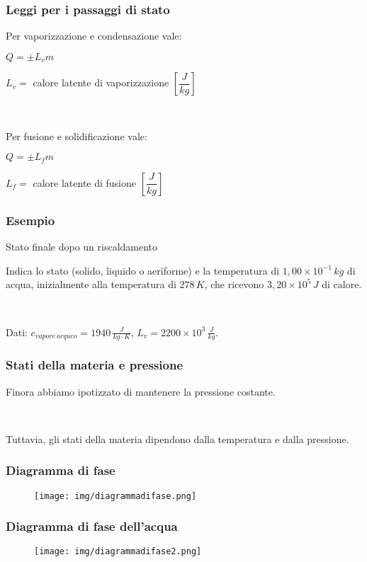 \documentclass[]{beamer}
\theoremstyle{plain}
\begin{document}
\begin{frame}
\frametitle{Leggi per i passaggi di stato}
Per \alert<1>{vaporizzazione e condensazione} vale:
\begin{center}
\colorbox{blue!30}{$ Q = \pm L_v m $}


$ L_v = $ calore latente di vaporizzazione $ \left[ \dfrac{J}{kg} \right] $
\end{center}\pause

~

Per \alert<2>{fusione e solidificazione} vale:
\begin{center}
\colorbox{blue!30}{$ Q = \pm L_f m $}


$ L_f = $ calore latente di fusione $ \left[ \dfrac{J}{kg} \right] $
\end{center}
\end{frame}


\begin{frame}
\frametitle{Esempio}
\begin{exampleblock}{Stato finale dopo un riscaldamento}
{\small Indica lo stato (solido, liquido o aeriforme) e la temperatura di $ 1,00 \times 10^{-1} \, kg  $ di acqua, inizialmente alla temperatura di $ 278 \, K $, che ricevono $ 3,20 \times 10^5 \, J  $ di calore.

~

Dati: $ c_{vapore \, acqueo} = 1940 \, \frac{J}{kg\cdot K} $, $ L_v = 2200 \times 10^3 \, \frac{J}{kg} $.}
\end{exampleblock}
\end{frame}



\begin{frame}
\frametitle{Stati della materia e pressione}
Finora abbiamo ipotizzato di \alert<1>{mantenere la pressione costante}.\pause

~

Tuttavia, gli stati della materia \alert<2>{dipendono dalla temperatura e dalla pressione}.

\begin{center}
\href{video/Acqua.mp4}{}
\end{center}
\end{frame}


\begin{frame}
\frametitle{Diagramma di fase}
\begin{figure}
\texttt{[image: img/diagrammadifase.png]}
\end{figure}
\end{frame}


\begin{frame}
\frametitle{Diagramma di fase dell'acqua}
\begin{figure}
\texttt{[image: img/diagrammadifase2.png]}
\end{figure}
\end{frame}
\end{document}
